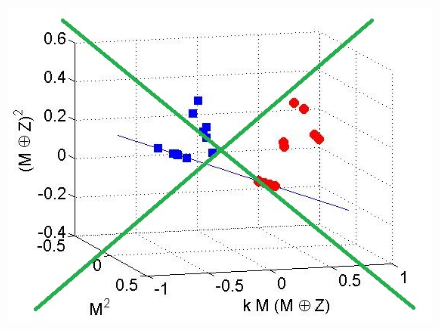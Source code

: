 \begin{frame}
\begin{columns}
\begin{column}{.5\textwidth}
{{\begin{figure}
\includegraphics[width=\textwidth]{figures/D3_proj.jpg} 
\end{figure}
}}

%

\end{column}
\end{columns}
%
%
\end{frame}


